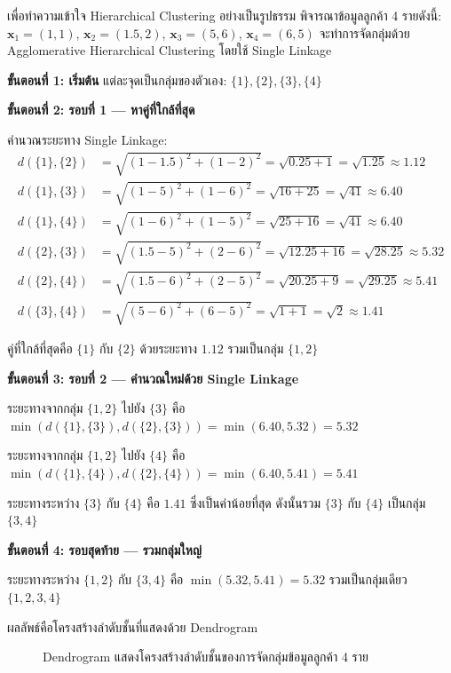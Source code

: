 \begin{exmp}
เพื่อทำความเข้าใจ Hierarchical Clustering อย่างเป็นรูปธรรม พิจารณาข้อมูลลูกค้า 4 รายดังนี้: $\mathbf{x}_1 = (1, 1)$, $\mathbf{x}_2 = (1.5, 2)$, $\mathbf{x}_3 = (5, 6)$, $\mathbf{x}_4 = (6, 5)$ จะทำการจัดกลุ่มด้วย Agglomerative Hierarchical Clustering โดยใช้ Single Linkage

\textbf{ขั้นตอนที่ 1: เริ่มต้น} แต่ละจุดเป็นกลุ่มของตัวเอง: $\{1\}, \{2\}, \{3\}, \{4\}$

\textbf{ขั้นตอนที่ 2: รอบที่ 1 --- หาคู่ที่ใกล้ที่สุด}

คำนวณระยะทาง Single Linkage:
\begin{align*}
d(\{1\}, \{2\}) &= \sqrt{(1-1.5)^2 + (1-2)^2} = \sqrt{0.25 + 1} = \sqrt{1.25} \approx 1.12 \\
d(\{1\}, \{3\}) &= \sqrt{(1-5)^2 + (1-6)^2} = \sqrt{16 + 25} = \sqrt{41} \approx 6.40 \\
d(\{1\}, \{4\}) &= \sqrt{(1-6)^2 + (1-5)^2} = \sqrt{25 + 16} = \sqrt{41} \approx 6.40 \\
d(\{2\}, \{3\}) &= \sqrt{(1.5-5)^2 + (2-6)^2} = \sqrt{12.25 + 16} = \sqrt{28.25} \approx 5.32 \\
d(\{2\}, \{4\}) &= \sqrt{(1.5-6)^2 + (2-5)^2} = \sqrt{20.25 + 9} = \sqrt{29.25} \approx 5.41 \\
d(\{3\}, \{4\}) &= \sqrt{(5-6)^2 + (6-5)^2} = \sqrt{1 + 1} = \sqrt{2} \approx 1.41
\end{align*}

คู่ที่ใกล้ที่สุดคือ $\{1\}$ กับ $\{2\}$ ด้วยระยะทาง $1.12$ รวมเป็นกลุ่ม $\{1, 2\}$

\textbf{ขั้นตอนที่ 3: รอบที่ 2 --- คำนวณใหม่ด้วย Single Linkage}

ระยะทางจากกลุ่ม $\{1, 2\}$ ไปยัง $\{3\}$ คือ $\min(d(\{1\}, \{3\}), d(\{2\}, \{3\})) = \min(6.40, 5.32) = 5.32$

ระยะทางจากกลุ่ม $\{1, 2\}$ ไปยัง $\{4\}$ คือ $\min(d(\{1\}, \{4\}), d(\{2\}, \{4\})) = \min(6.40, 5.41) = 5.41$

ระยะทางระหว่าง $\{3\}$ กับ $\{4\}$ คือ $1.41$ ซึ่งเป็นค่าน้อยที่สุด ดังนั้นรวม $\{3\}$ กับ $\{4\}$ เป็นกลุ่ม $\{3, 4\}$

\textbf{ขั้นตอนที่ 4: รอบสุดท้าย --- รวมกลุ่มใหญ่}

ระยะทางระหว่าง $\{1, 2\}$ กับ $\{3, 4\}$ คือ $\min(5.32, 5.41) = 5.32$ รวมเป็นกลุ่มเดียว $\{1, 2, 3, 4\}$

ผลลัพธ์คือโครงสร้างลำดับชั้นที่แสดงด้วย Dendrogram
\end{exmp}

\begin{figure}[h]
    \centering
    \caption{Dendrogram แสดงโครงสร้างลำดับชั้นของการจัดกลุ่มข้อมูลลูกค้า 4 ราย}
    \label{fig:dendrogram}
\end{figure}

